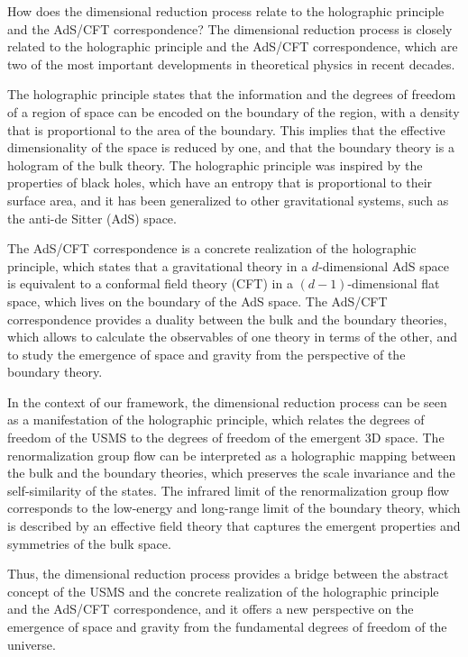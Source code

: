 \begin{tcolorbox}[colback=green!5!white,colframe=green!75!black,title=Question]
How does the dimensional reduction process relate to the holographic principle and the AdS/CFT correspondence?
\tcblower
The dimensional reduction process is closely related to the holographic principle and the AdS/CFT correspondence, which are two of the most important developments in theoretical physics in recent decades.

The holographic principle states that the information and the degrees of freedom of a region of space can be encoded on the boundary of the region, with a density that is proportional to the area of the boundary. This implies that the effective dimensionality of the space is reduced by one, and that the boundary theory is a hologram of the bulk theory. The holographic principle was inspired by the properties of black holes, which have an entropy that is proportional to their surface area, and it has been generalized to other gravitational systems, such as the anti-de Sitter (AdS) space.

The AdS/CFT correspondence is a concrete realization of the holographic principle, which states that a gravitational theory in a $d$-dimensional AdS space is equivalent to a conformal field theory (CFT) in a $(d-1)$-dimensional flat space, which lives on the boundary of the AdS space. The AdS/CFT correspondence provides a duality between the bulk and the boundary theories, which allows to calculate the observables of one theory in terms of the other, and to study the emergence of space and gravity from the perspective of the boundary theory.

In the context of our framework, the dimensional reduction process can be seen as a manifestation of the holographic principle, which relates the degrees of freedom of the USMS to the degrees of freedom of the emergent 3D space. The renormalization group flow can be interpreted as a holographic mapping between the bulk and the boundary theories, which preserves the scale invariance and the self-similarity of the states. The infrared limit of the renormalization group flow corresponds to the low-energy and long-range limit of the boundary theory, which is described by an effective field theory that captures the emergent properties and symmetries of the bulk space.

Thus, the dimensional reduction process provides a bridge between the abstract concept of the USMS and the concrete realization of the holographic principle and the AdS/CFT correspondence, and it offers a new perspective on the emergence of space and gravity from the fundamental degrees of freedom of the universe.
\end{tcolorbox}

